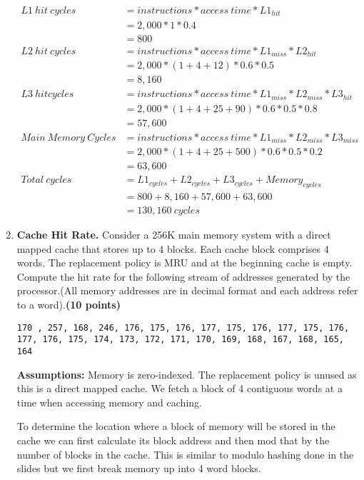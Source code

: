 \documentclass[a4paper, 11pt]{exam}
\begin{document}
\begin{enumerate}
\begin{align*}
L1 \ hit \ cycles &= instructions * access \ time * L1_{hit} \\ 
            &= 2,000 * 1 * 0.4 \\
            &= 800 \\
L2 \ hit \ cycles &= instructions * access \ time * L1_{miss} * L2_{hit} \\
            &= 2,000 * (1 + 4 + 12) * 0.6 * 0.5\\
            &= 8,160 \\
L3 \ hit cycles &= instructions * access \ time * L1_{miss} * L2_{miss} * L3_{hit}\\
            &= 2,000 * (1 + 4 + 25 + 90) * 0.6 * 0.5 * 0.8\\
            &= 57,600\\
Main \ Memory \ Cycles &= instructions * access \ time * L1_{miss} * L2_{miss} * L3_{miss} \\
                       &= 2,000 * (1 + 4 + 25 + 500) * 0.6 * 0.5 * 0.2\\
                       &= 63,600\\
Total \ cycles &= L1_{cycles} + L2_{cycles} + L3_{cycles} + Memory_{cycles}\\
               &= 800 + 8,160 + 57,600 + 63,600 \\
               &= 130,160 \ cycles                      
\end{align*}

\newpage
\item \textbf{Cache Hit Rate.}
Consider a 256K main memory system with a direct mapped cache that stores up to 4 blocks. Each cache block comprises 4 words. The replacement policy is MRU and at the beginning cache is empty. Compute the hit rate for the following stream of addresses generated by the processor.(All memory addresses are in decimal format and each address refer to a word).\textbf{(10 points)}

\texttt{170 , 257, 168, 246, 176, 175, 176, 177, 175, 176, 177, 175, 176, 177, 176, 175, 174, 173, 172, 171, 170, 169, 168, 167, 168, 165, 164}

\textbf{Assumptions:} Memory is zero-indexed. The replacement policy is unused as this is a direct mapped cache. We fetch a block of 4 contiguous words at a time when accessing memory and caching.

To determine the location where a block of memory will be stored in the cache we can first calculate its block address and then mod that by the number of blocks in the cache. This is similar to modulo hashing done in the slides but we first break memory up into 4 word blocks.


\end{enumerate}
\end{document}
